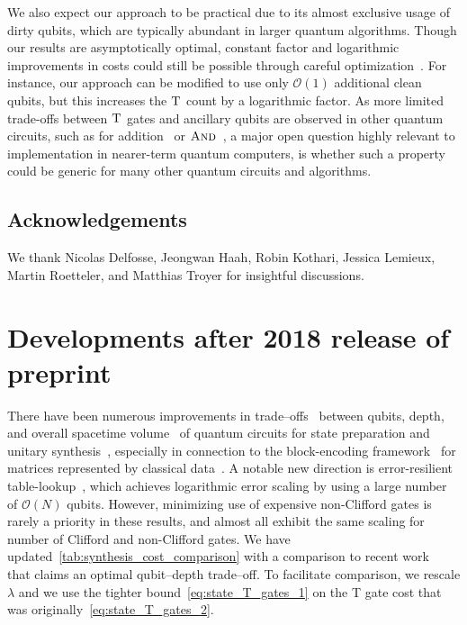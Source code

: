 \documentclass[a4paper,onecolumn,10pt,accepted=2024-05-22]{quantumarticle}
\begin{document}
 We also expect our approach to be practical due to its almost exclusive usage of dirty qubits, which are typically abundant in larger quantum algorithms. Though our results are asymptotically optimal, constant factor and logarithmic improvements in costs could still be possible through careful optimization~\cite{Matteo2020QRAMresources,Kliuchnikov2022Spacetime}. For instance, our approach can be modified to use only $\mathcal{O}(1)$ additional clean qubits, but this increases the $\textsc{T}$ count by a logarithmic factor. As more limited trade-offs between $\textsc{T}$ gates and ancillary qubits are observed in other quantum circuits, such as for addition~\cite{Gidney2018Addition} or $\textsc{And}$~\cite{Barenco1995gates}, a major open question highly relevant to implementation in nearer-term quantum computers, is whether such a property could be generic for many other quantum circuits and algorithms.


	\subsection{Acknowledgements}
 We thank Nicolas Delfosse, Jeongwan Haah, Robin Kothari, Jessica Lemieux, Martin Roetteler, and Matthias Troyer for insightful discussions.

\section{Developments after 2018 release of preprint}
There have been numerous improvements in trade--offs~\cite{Sun2023State} between qubits, depth, and overall spacetime volume~\cite{Gui2024spacetime} of quantum circuits for state preparation and unitary synthesis~\cite{Sun2023State}, especially in connection to the block-encoding framework~\cite{Low2016Qubitization,Chakraborty2018BlockEncoding} for matrices represented by classical data~\cite{Clader2022Blockencode}. 
%
A notable new direction is error-resilient table-lookup~\cite{Haan2021QRAM}, which achieves logarithmic error scaling by using a large number of $\mathcal{O}(N)$ qubits. 
%
However, minimizing use of expensive non-Clifford gates is rarely a priority in these results, and almost all exhibit the same scaling for number of Clifford and non-Clifford gates.
%
We have updated~\cref{tab:synthesis_cost_comparison} with a comparison to recent work~\cite{Sun2023State} that claims an optimal qubit--depth trade--off.
%
To facilitate comparison, we rescale $\lambda$ and we use the tighter bound~\cref{eq:state_T_gates_1} on the \textsc{T} gate cost that was originally~\cref{eq:state_T_gates_2}.
%
\end{document}
